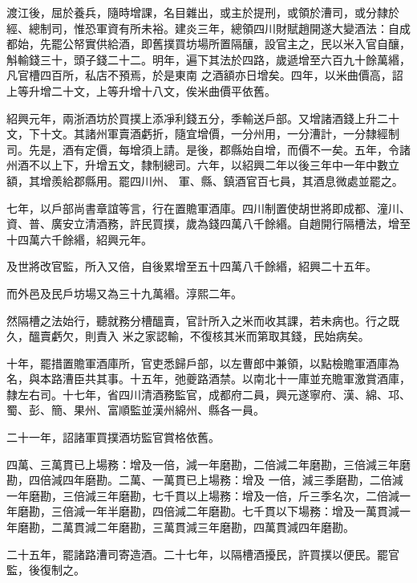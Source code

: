\begin{pinyinscope}
 渡江後，屈於養兵，隨時增課，名目雜出，或主於提刑，或領於漕司，或分隸於經、總制司，惟恐軍資有所未裕。建炎三年，總領四川財賦趙開遂大變酒法：自成都始，先罷公帑實供給酒，即舊撲買坊場所置隔釀，設官主之，民以米入官自釀，斛輸錢三十，頭子錢二十二。明年，遍下其法於四路，歲遞增至六百九十餘萬緡，凡官槽四百所，私店不預焉，於是東南
 之酒額亦日增矣。四年，以米曲價高，詔上等升增二十文，上等升增十八文，俟米曲價平依舊。



 紹興元年，兩浙酒坊於買撲上添凈利錢五分，季輸送戶部。又增諸酒錢上升二十文，下十文。其諸州軍賣酒虧折，隨宜增價，一分州用，一分漕計，一分隸經制司。先是，酒有定價，每增須上請。是後，郡縣始自增，而價不一矣。五年，令諸州酒不以上下，升增五文，隸制總司。六年，以紹興二年以後三年中一年中數立額，其增羨給郡縣用。罷四川州、
 軍、縣、鎮酒官百七員，其酒息微處並罷之。



 七年，以戶部尚書章誼等言，行在置贍軍酒庫。四川制置使胡世將即成都、潼川、資、普、廣安立清酒務，許民買撲，歲為錢四萬八千餘緡。自趙開行隔槽法，增至十四萬六千餘緡，紹興元年。



 及世將改官監，所入又倍，自後累增至五十四萬八千餘緡，紹興二十五年。



 而外邑及民戶坊場又為三十九萬緡。淳熙二年。



 然隔槽之法始行，聽就務分槽醞賣，官計所入之米而收其課，若未病也。行之既久，醞賣虧欠，則責入
 米之家認輸，不復核其米而第取其錢，民始病矣。



 十年，罷措置贍軍酒庫所，官吏悉歸戶部，以左曹郎中兼領，以點檢贍軍酒庫為名，與本路漕臣共其事。十五年，弛夔路酒禁。以南北十一庫並充贍軍激賞酒庫，隸左右司。十七年，省四川清酒務監官，成都府二員，興元遂寧府、漢、綿、邛、蜀、彭、簡、果州、富順監並漢州綿州、縣各一員。



 二十一年，詔諸軍買撲酒坊監官賞格依舊。



 四萬、三萬貫已上場務：增及一倍，減一年磨勘，二倍減二年磨勘，三倍減三年磨勘，四倍減四年磨勘。二萬、一萬貫已上場務：增及
 一倍，減三季磨勘，二倍減一年磨勘，三倍減三年磨勘，七千貫以上場務：增及一倍，斤三季名次，二倍減一年磨勘，三倍減一年半磨勘，四倍減二年磨勘。七千貫以下場務：增及一萬貫減一年磨勘，二萬貫減二年磨勘，三萬貫減三年磨勘，四萬貫減四年磨勘。



 二十五年，罷諸路漕司寄造酒。二十七年，以隔槽酒擾民，許買撲以便民。罷官監，後復制之。




\end{pinyinscope}
